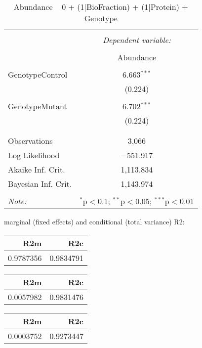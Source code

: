 \documentclass[11pt]{report}
\begin{document}
\begin{table}[!htbp] \centering 
  \caption{Abundance ~ 0 + (1|BioFraction) + (1|Protein) + Genotype} 
  \label{} 
\begin{tabular}{@{\extracolsep{5pt}}lc} 
\\[-1.8ex]\hline 
\hline \\[-1.8ex] 
 & \multicolumn{1}{c}{\textit{Dependent variable:}} \\ 
\cline{2-2} 
\\[-1.8ex] & Abundance \\ 
\hline \\[-1.8ex] 
 GenotypeControl & 6.663$^{***}$ \\ 
  & (0.224) \\ 
  & \\ 
 GenotypeMutant & 6.702$^{***}$ \\ 
  & (0.224) \\ 
  & \\ 
\hline \\[-1.8ex] 
Observations & 3,066 \\ 
Log Likelihood & $-$551.917 \\ 
Akaike Inf. Crit. & 1,113.834 \\ 
Bayesian Inf. Crit. & 1,143.974 \\ 
\hline 
\hline \\[-1.8ex] 
\textit{Note:}  & \multicolumn{1}{r}{$^{*}$p$<$0.1; $^{**}$p$<$0.05; $^{***}$p$<$0.01} \\ 
\end{tabular} 
\end{table} 
marginal (fixed effects) and conditional (total variance) R2:

\begin{tabular}{r|r}
\hline
R2m & R2c\\
\hline
0.9787356 & 0.9834791\\
\hline
\end{tabular}

\begin{tabular}{r|r}
\hline
R2m & R2c\\
\hline
0.0057982 & 0.9831476\\
\hline
\end{tabular}

\begin{tabular}{r|r}
\hline
R2m & R2c\\
\hline
0.0003752 & 0.9273447\\
\hline
\end{tabular}
\end{document}
